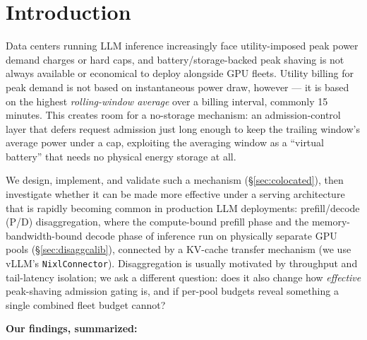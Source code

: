 \documentclass[sigconf,review,anonymous]{acmart}
\begin{document}
\maketitle

\section{Introduction}

Data centers running LLM inference increasingly face utility-imposed peak power demand
charges or hard caps, and battery/storage-backed peak shaving is not always available or
economical to deploy alongside GPU fleets. Utility billing for peak demand is not based on
instantaneous power draw, however --- it is based on the highest \emph{rolling-window
average} over a billing interval, commonly 15 minutes. This creates room for a no-storage
mechanism: an admission-control layer that defers request admission just long enough to keep
the trailing window's average power under a cap, exploiting the averaging window as a
``virtual battery'' that needs no physical energy storage at all.

We design, implement, and validate such a mechanism (\S\ref{sec:colocated}), then investigate
whether it can be made more effective under a serving architecture that is rapidly becoming
common in production LLM deployments: prefill/decode (P/D) disaggregation, where the
compute-bound prefill phase and the memory-bandwidth-bound decode phase of inference run on
physically separate GPU pools (\S\ref{sec:disaggcalib}), connected by a KV-cache transfer
mechanism (we use vLLM's \texttt{NixlConnector}). Disaggregation is usually motivated by
throughput and tail-latency isolation; we ask a different question: does it also change how
\emph{effective} peak-shaving admission gating is, and if per-pool budgets reveal something a
single combined fleet budget cannot?

\textbf{Our findings, summarized:}
\end{document}
